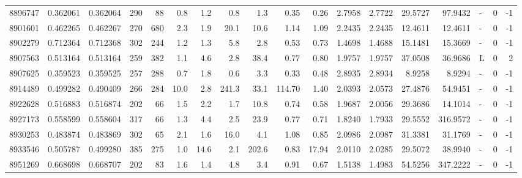 \begin{tabular}{rrrrrrrrrrrrrrrlrr}
   8896747 & 0.362061 &   0.362064 &  290 &   88 &      0.8 &      1.2 &     0.8 &      1.3 &       0.35 &        0.26 &  2.7958 &  2.7722 &   29.5727 &   97.9432 &             - &        0 &         -1 \\
   8901601 & 0.462265 &   0.462267 &  270 &  680 &      2.3 &      1.9 &    20.1 &     10.6 &       1.14 &        1.09 &  2.2435 &  2.2435 &   12.4611 &   12.4611 &             - &        0 &         -1 \\
   8902279 & 0.712364 &   0.712368 &  302 &  244 &      1.2 &      1.3 &     5.8 &      2.8 &       0.53 &        0.73 &  1.4698 &  1.4688 &   15.1481 &   15.3669 &             - &        0 &         -1 \\
   8907563 & 0.513164 &   0.513164 &  259 &  382 &      1.1 &      4.6 &     2.8 &     38.4 &       0.77 &        0.80 &  1.9757 &  1.9757 &   37.0508 &   36.9686 &             L &        0 &          2 \\
   8907625 & 0.359523 &   0.359525 &  257 &  288 &      0.7 &      1.8 &     0.6 &      3.3 &       0.33 &        0.48 &  2.8935 &  2.8934 &    8.9258 &    8.9294 &             - &        0 &         -1 \\
   8914489 & 0.499282 &   0.490409 &  266 &  284 &     10.0 &      2.8 &   241.3 &     33.1 &     114.70 &        1.40 &  2.0393 &  2.0573 &   27.4876 &   54.9451 &             - &        0 &         -1 \\
   8922628 & 0.516883 &   0.516874 &  202 &   66 &      1.5 &      2.2 &     1.7 &     10.8 &       0.74 &        0.58 &  1.9687 &  2.0056 &   29.3686 &   14.1014 &             - &        0 &         -1 \\
   8927173 & 0.558599 &   0.558604 &  317 &   66 &      1.3 &      4.4 &     2.5 &     23.9 &       0.77 &        0.71 &  1.8240 &  1.7933 &   29.5552 &  316.9572 &             - &        0 &         -1 \\
   8930253 & 0.483874 &   0.483869 &  302 &   65 &      2.1 &      1.6 &    16.0 &      4.1 &       1.08 &        0.85 &  2.0986 &  2.0987 &   31.3381 &   31.1769 &             - &        0 &         -1 \\
   8933546 & 0.505787 &   0.499280 &  385 &  275 &      1.0 &     14.6 &     2.1 &    202.6 &       0.83 &       17.94 &  2.0110 &  2.0285 &   29.5072 &   38.9940 &             - &        0 &         -1 \\
   8951269 & 0.668698 &   0.668707 &  202 &   83 &      1.6 &      1.4 &     4.8 &      3.4 &       0.91 &        0.67 &  1.5138 &  1.4983 &   54.5256 &  347.2222 &             - &        0 &         -1 \\

\end{tabular}
